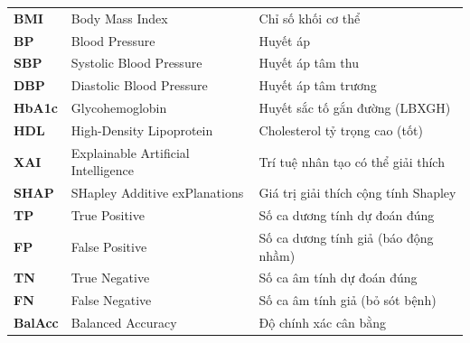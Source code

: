 \begin{longtable}{p{2.5cm} p{6.5cm} p{6.0cm}}
\textbf{BMI}    & Body Mass Index & Chỉ số khối cơ thể \\
\textbf{BP}     & Blood Pressure & Huyết áp \\
\textbf{SBP}    & Systolic Blood Pressure & Huyết áp tâm thu \\
\textbf{DBP}    & Diastolic Blood Pressure & Huyết áp tâm trương \\
\textbf{HbA1c}  & Glycohemoglobin & Huyết sắc tố gắn đường (LBXGH) \\
\textbf{HDL}    & High-Density Lipoprotein & Cholesterol tỷ trọng cao (tốt) \\
\textbf{XAI}    & Explainable Artificial Intelligence & Trí tuệ nhân tạo có thể giải thích \\
\textbf{SHAP}   & SHapley Additive exPlanations & Giá trị giải thích cộng tính Shapley \\
\textbf{TP}     & True Positive & Số ca dương tính dự đoán đúng \\
\textbf{FP}     & False Positive & Số ca dương tính giả (báo động nhầm) \\
\textbf{TN}     & True Negative & Số ca âm tính dự đoán đúng \\
\textbf{FN}     & False Negative & Số ca âm tính giả (bỏ sót bệnh) \\
\textbf{BalAcc} & Balanced Accuracy & Độ chính xác cân bằng \\
\bottomrule
\end{longtable}
\cleardoublepage

